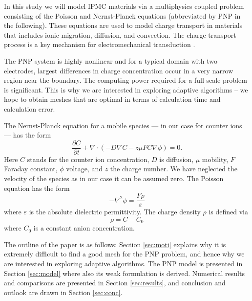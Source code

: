 \newpage

In this study we will model IPMC materials via a multiphysics coupled problem 
consisting of the Poisson and Nernst-Planck equations (abbreviated by PNP in
the following). These equations are used to model charge transport in materials 
that includes ionic migration, diffusion, and convection. The charge transport 
process is a key mechanism for electromechanical transduction 
\cite{basu1997membrane,shahinpoor2001smartmat,
nasser2002applied,newbury2003intelligent, wallmersperger2007appliedphysics,
pugal2008appliedphysics,pugal2010polymer}.

The PNP system is highly nonlinear and for a typical domain with two
electrodes, largest differences in charge concentration occur in a very narrow
region near the boundary. The computing power required for a full scale problem 
is significant. This is why we are interested in exploring adaptive algorithms
-- we hope to obtain meshes that are optimal in terms of calculation time and 
calculation error.

The Nernst-Planck equation for a mobile species ---
in our case for counter ions --- has the form
\begin{equation}
  \frac{\partial C}{\partial t}+\nabla\cdot(-D\nabla C-z\mu FC\nabla\phi)=0.
  \label{eq:nernst-planck}
\end{equation}
Here $C$ stands for the counter ion concentration, $D$ is diffusion, $\mu$ mobility,
$F$ Faraday constant, $\phi$ voltage, and $z$ the charge number. We have neglected 
the velocity of the species as in our case it can be assumed zero. 
The Poisson equation has the form
\begin{equation}
  -\nabla^2\phi=\frac{F\rho}{\varepsilon}
  \label{eq:poisson}
\end{equation}
where $\varepsilon$ is the absolute dielectric permittivity. The
charge density $\rho$ is defined via
\begin{equation}
  \rho=C-C_{0}
  \label{eq:rho}
\end{equation}
where $C_{0}$ is a constant anion concentration.

The outline of the paper is as follows: Section \ref{sec:moti} explains why 
it is extremely difficult to find a good mesh for the PNP problem, and 
hence why we are interested in exploring adaptive algorithms. The PNP model 
is presented in Section \ref{sec:model} where also its weak formulation is derived. 
Numerical results and comparisons are presented in Section \ref{sec:results},
and conclusion and outlook are drawn in Section \ref{sec:conc}.


